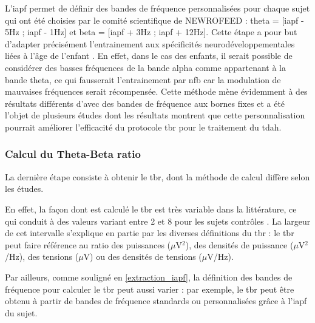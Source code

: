 L'\gls{iapf} permet de définir des bandes de fréquence personnalisées pour chaque sujet qui ont été choisies 
par le comité scientifique de NEWROFEED : theta = [\gls{iapf} - 5Hz ; \gls{iapf} - 1Hz] et beta = [\gls{iapf} + 3Hz ; \gls{iapf} + 12Hz].
Cette étape a pour but d'adapter précisément l'entrainement aux spécificités neurodéveloppementales liées à l'âge de l'enfant \citep{Aurlien2004}. En effet, dans le cas des enfants, 
il serait possible de considérer 
des basses fréquences de la bande alpha comme appartenant à la bande theta, ce qui fausserait l'entrainement par \gls{nfb} car la modulation de mauvaises fréquences 
serait récompensée. Cette méthode mène évidemment à des résultats différents d'avec des bandes de fréquence aux bornes fixes \citep{Arns2008, Vollebregt2015} et a été 
l'objet de plusieurs études \citep{Kaiser2001, Bazanova2006, Vollebregt2015} dont les résultats montrent que cette personnalisation pourrait améliorer l'efficacité du protocole
\gls{tbr} pour le traitement du \gls{tdah}.

\subsubsection{Calcul du Theta-Beta ratio} \label{tbr_computation}
La dernière étape consiste à obtenir le \gls{tbr}, dont la méthode de calcul diffère selon les études.

En effet, la façon dont est calculé le \gls{tbr} est très variable dans la littérature, ce qui conduit à des valeurs variant entre 2 et 8 pour les sujets contrôles \citep{Arns2012,
Schutte2017}. La largeur de cet intervalle s'explique en partie par les diverses définitions du \gls{tbr} : le \gls{tbr} peut faire référence au ratio
des puissances ($\mu$V$^2$), des densités de puissance ($\mu$V$^2$/Hz), des tensions ($\mu$V) ou des densités de tensions ($\mu$V/Hz).  

Par ailleurs, comme souligné en \ref{extraction_iapf}, la définition des bandes de fréquence pour calculer le \gls{tbr} peut aussi varier : par exemple, le \gls{tbr} peut être obtenu à partir
de bandes de fréquence standards ou personnalisées grâce à l'\gls{iapf} du sujet. 

